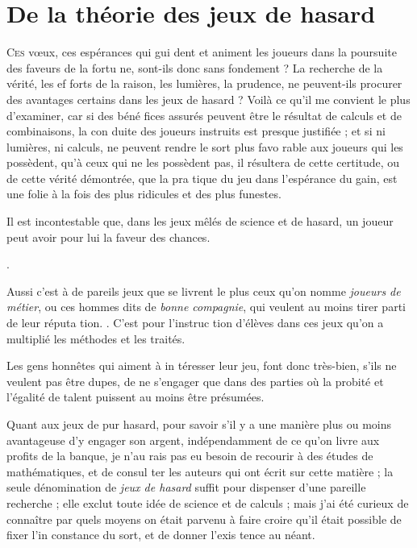 \chapter
    [De la Théorie des Jeux de hasard]
    {De la théorie des jeux de hasard}

\lettrine{C}{es} vœux, ces espérances qui gui%
dent et animent les joueurs dans la
poursuite des faveurs de la fortu%
ne, sont-ils donc sans fondement ?
La recherche de la vérité, les ef%
forts de la raison, les lumières, la
prudence, ne peuvent-ils procurer
des avantages certains dans les jeux
de hasard ? Voilà ce qu'il me convient
le plus d'examiner, car si des béné%
fices assurés peuvent être le résultat
de calculs et de combinaisons, la con%
duite des joueurs instruits est presque
justifiée ; et si ni lumières, ni calculs,
ne peuvent rendre le sort plus favo%
rable aux joueurs qui les possèdent,
qu'à ceux qui ne les possèdent pas,
il résultera de cette certitude, ou de
cette vérité démontrée, que la pra%
tique du jeu dans l'espérance du gain,
est une folie à la fois des plus ridicules
et des plus funestes.

Il est incontestable que, dans les
jeux mêlés de science et de hasard, un
joueur peut avoir pour lui la faveur
des chances.

.

Aussi c'est à de pareils jeux que se
livrent le plus ceux qu'on nomme
\emph{joueurs de métier}, ou ces hommes
dits de \emph{bonne compagnie}, qui veulent
au moins tirer parti de leur réputa%
tion. . C'est pour l'instruc%
tion d'élèves dans ces jeux qu'on a
multiplié les méthodes et les traités.

Les gens honnêtes qui aiment à in%
téresser leur jeu, font donc très-bien,
s'ils ne veulent pas être dupes, de ne
s'engager que dans des parties où la
probité et l'égalité de talent puissent
au moins être présumées.

Quant aux jeux de pur hasard, pour
savoir s'il y a une manière plus ou
moins avantageuse d'y engager son
argent, indépendamment de ce qu'on
livre aux profits de la banque, je n'au%
rais pas eu besoin de recourir à des
études de mathématiques, et de consul%
ter les auteurs qui ont écrit sur cette
matière ; la seule dénomination de
\emph{jeux de hasard} suffit pour dispenser 
d'une pareille recherche ; elle exclut
toute idée de science et de calculs ;
mais j'ai été curieux de connaître par
quels moyens on était parvenu à faire
croire qu'il était possible de fixer l'in%
constance du sort, et de donner l'exis%
tence au néant.

